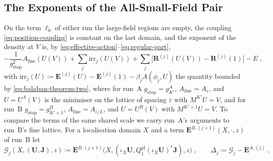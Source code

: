 \documentclass[11pt]{preprint}
\numberwithin{equation}{section}
\theoremstyle{definition}
\theoremstyle{remark}
\theoremstyle{plain}
\begin{document}
\subsection{The Exponents of the All-Small-Field Pair}\label{sec:exponent-difference}

On the term $\ell_0$ of either run the large-field regions are empty, the coupling \eqref{eq:position-coupling} is constant on the last domain, and the exponent of the density at $V$ is, by \eqref{eq:effective-action}--\eqref{eq:regular-part},
\begin{equation}\label{eq:trivial-exponent}
    -\frac{1}{g_{\mathrm{stop}}^2}A_{\mathrm{fine}}(U(V)) + \sum_j\mathrm{irr}_j(U(V)) + \sum_j\bigl[\mathbf R^{(j)}(U(V)) - \mathbf R^{(j)}(1)\bigr] - E\;,
\end{equation}
with $\mathrm{irr}_j(U) \coloneqq \mathbf E^{(j)}(U) - \mathbf E^{(j)}(1) - \beta_jA(\phi_j, U)$ the quantity bounded by \eqref{eq:balaban-theorem-two}, where for run~A $g_{\mathrm{stop}} = g^A_{K'}$, $A_{\mathrm{fine}} = A_\varepsilon$, and $U = U^A(V)$ is the minimiser on the lattice of spacing $\varepsilon$ with $M^{K'}U = V$, and for run~B $g_{\mathrm{stop}} = g^B_{K'+1}$, $A_{\mathrm{fine}} = A_{\varepsilon/L}$, and $U = U^B(V)$ with $M^{K'+1}U = V$. To compare the terms of the same shared scale we carry run~A's arguments to run~B's fine lattice. For a localisation domain $X$ and a term $\mathbf E^{B,(j+1)}(X, \cdot, z)$ of run~B let
\begin{equation}\label{eq:lifted-term}
    \mathcal G_j(X, (\mathbf U, \mathbf J), z) \coloneqq \mathbf E^{B,(j+1)}\bigl(X, (\iota_X\mathbf U, Q^{\mathrm{pl}}_1(\iota_X\mathbf U)^*\mathbf J), z\bigr)\;,
    \qquad
    \Delta_j \coloneqq \mathcal G_j - \mathbf E^{A,(j)}\;,
\end{equation}
\end{document}
